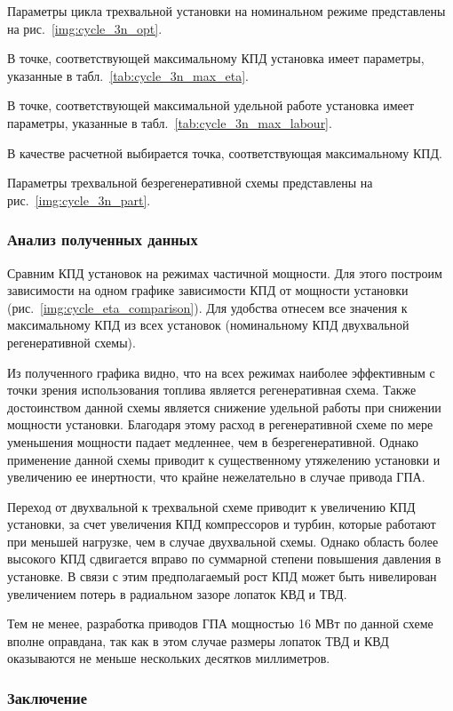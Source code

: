 Параметры цикла трехвальной установки на номинальном режиме представлены на рис.~\ref{img:cycle_3n_opt}.

В точке, соответствующей максимальному КПД установка имеет параметры, указанные в табл.~\ref{tab:cycle_3n_max_eta}.

В точке, соответствующей максимальной удельной работе установка имеет параметры, указанные в табл.~\ref{tab:cycle_3n_max_labour}.

В качестве расчетной выбирается точка, соответствующая максимальному КПД.

Параметры трехвальной безрегенеративной схемы представлены на рис.~\ref{img:cycle_3n_part}.

\subsubsection{Анализ полученных данных}
Сравним КПД установок на режимах частичной мощности. Для этого построим зависимости на одном графике зависимости КПД от мощности установки (рис.~\ref{img:cycle_eta_comparison}). Для удобства отнесем все значения к максимальному КПД из всех установок (номинальному КПД двухвальной регенеративной схемы).

Из полученного графика видно, что на всех режимах наиболее эффективным с точки зрения использования топлива является регенеративная схема. Также достоинством данной схемы является снижение удельной работы при снижении мощности установки. Благодаря этому расход в регенеративной схеме по мере уменьшения мощности падает медленнее, чем в безрегенеративной. Однако применение данной схемы приводит к существенному утяжелению установки и увеличению ее инертности, что крайне нежелательно в случае привода ГПА. 

Переход от двухвальной к трехвальной схеме приводит к увеличению КПД установки, за счет увеличения КПД компрессоров и турбин, которые работают при меньшей нагрузке, чем в случае двухвальной схемы. Однако область более высокого КПД сдвигается вправо по суммарной степени повышения давления в установке. В связи с этим предполагаемый рост КПД может быть нивелирован увеличением потерь в радиальном зазоре лопаток КВД и ТВД.

Тем не менее, разработка приводов ГПА мощностью 16 МВт по данной схеме вполне оправдана, так как в этом случае размеры лопаток ТВД и КВД оказываются не меньше нескольких десятков миллиметров.


\subsubsection{Заключение}

